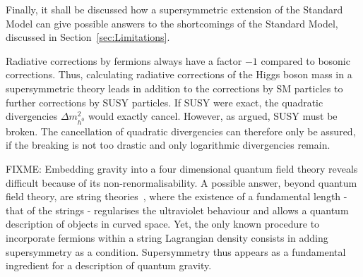 Finally, it shall be discussed how a supersymmetric extension of the Standard Model can give possible answers to the shortcomings of the Standard Model, discussed in Section~\ref{sec:Limitations}.

Radiative corrections by fermions always have a factor $-1$ compared to bosonic corrections.
Thus, calculating radiative corrections of the Higgs boson mass in a supersymmetric theory leads in addition to the corrections by SM particles to further corrections by SUSY particles.
If SUSY were exact, the quadratic divergencies $\Delta m^2_{h^0}$ would exactly cancel. 
However, as argued, SUSY must be broken.
The cancellation of quadratic divergencies can therefore only be assured, if the breaking is not too drastic and only logarithmic divergencies remain.

FIXME: Embedding gravity into a four dimensional quantum field theory reveals difficult because of its non-renormalisability. %
A possible answer, beyond quantum field theory, are string theories~\cite{bib:Strings_1974}, where the existence of a fundamental length - that of the strings - regularises the ultraviolet behaviour and allows a quantum description of objects in curved space.
Yet, the only known procedure to incorporate fermions within a string Lagrangian density consists in adding supersymmetry as a condition. 
Supersymmetry thus appears as a fundamental ingredient for a description of quantum gravity. %



